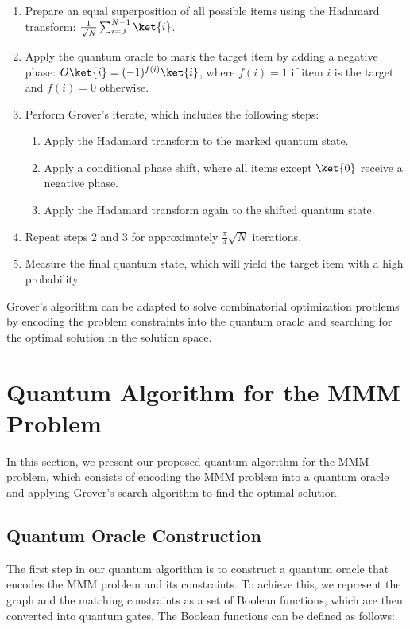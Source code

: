 \begin{enumerate}
    \item Prepare an equal superposition of all possible items using the Hadamard transform: $\frac{1}{\sqrt{N}} \sum_{i=0}^{N-1} \ket{i}$.
    \item Apply the quantum oracle to mark the target item by adding a negative phase: $O \ket{i} = (-1)^{f(i)} \ket{i}$, where $f(i) = 1$ if item $i$ is the target and $f(i) = 0$ otherwise.
    \item Perform Grover's iterate, which includes the following steps:
    \begin{enumerate}
        \item Apply the Hadamard transform to the marked quantum state.
        \item Apply a conditional phase shift, where all items except $\ket{0}$ receive a negative phase.
        \item Apply the Hadamard transform again to the shifted quantum state.
    \end{enumerate}
    \item Repeat steps 2 and 3 for approximately $\frac{\pi}{4}\sqrt{N}$ iterations.
    \item Measure the final quantum state, which will yield the target item with a high probability.
\end{enumerate}

Grover's algorithm can be adapted to solve combinatorial optimization problems by encoding the problem constraints into the quantum oracle and searching for the optimal solution in the solution space.

\section{Quantum Algorithm for the MMM Problem}
\label{sec:quantum_algorithm}

In this section, we present our proposed quantum algorithm for the MMM problem, which consists of encoding the MMM problem into a quantum oracle and applying Grover's search algorithm to find the optimal solution.

\subsection{Quantum Oracle Construction}

The first step in our quantum algorithm is to construct a quantum oracle that encodes the MMM problem and its constraints. To achieve this, we represent the graph and the matching constraints as a set of Boolean functions, which are then converted into quantum gates. The Boolean functions can be defined as follows:

